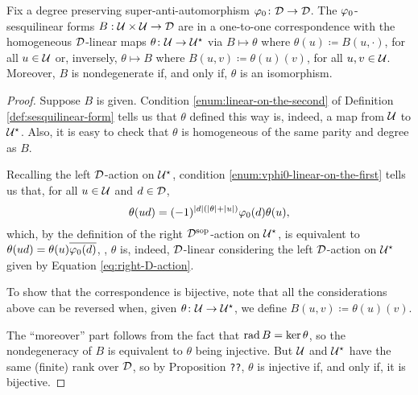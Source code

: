 \begin{prop}\label{prop:sesquilinear-form-iff-D-linear-map}
    Fix a degree preserving su\-per\--an\-ti\--auto\-mor\-phism $\varphi_0\colon \mathcal{D} \to \mathcal{D}$. 
    The $\varphi_0$-sesquilinear forms $B:\mathcal U\times\mathcal U \to \mathcal{D}$ are in a one-to-one correspondence with the homogeneous $\mathcal{D}$-linear maps $\theta\colon \mathcal U \to \mathcal U^\star$ via $B \mapsto \theta$ where $\theta(u) \coloneqq B(u, \cdot)$, for all $u \in \mathcal U$ or, inversely, $\theta \mapsto B$ where $B(u,v) \coloneqq \theta(u)(v)$, for all $u, v\in \mathcal U$. 
    Moreover, $B$ is nondegenerate if, and only if, $\theta$ is an isomorphism.
\end{prop}

\begin{proof}
    Suppose $B$ is given. Condition \eqref{enum:linear-on-the-second} of Definition \ref{def:sesquilinear-form} tells us that $\theta$ defined this way is, indeed, a map from $\mathcal U$ to $\mathcal U^\star$. 
    Also, it is easy to check that $\theta$ is homogeneous of the same parity and degree as $B$.
    
    Recalling the left $\mathcal{D}$-action on $\mathcal U^\star$, condition \eqref{enum:vphi0-linear-on-the-first} tells us that, for all $u\in \mathcal U$ and $d\in \mathcal{D}$,
    \[
        \theta (ud) = (-1)^{|d|(|\theta|+|u|)}\varphi_0 (d) \theta (u),
    \]
    which, by the definition of the right $\mathcal{D}^{\mathrm{sop}}$-action on $\mathcal U^\star$, is equivalent to $\theta(ud) = \theta(u) \overline{\varphi_0(d)}$, \ie, $\theta$ is, indeed, $\mathcal{D}$-linear considering the left $\mathcal{D}$-action on $\mathcal U^\star$ given by Equation \eqref{eq:right-D-action}.
    
    To show that the correspondence is bijective, note that all the considerations above can be reversed when, given $\theta\colon \mathcal U \to \mathcal U^\star$, we define  $B(u, v) \coloneqq \theta(u)(v)$.
    
    The ``moreover'' part follows from the fact that $\operatorname{rad} B = \ker \theta$, so the nondegeneracy of $B$ is equivalent to $\theta$ being injective. But $\mathcal U$ and $\mathcal U^\star$ have the same (finite) rank over $\mathcal{D}$, so by Proposition {\tt ??}, $\theta$ is injective if, and only if, it is bijective.
\end{proof}


